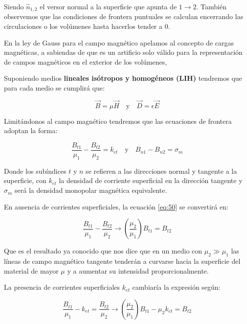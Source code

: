 Siendo $\hat{n}_{1,2}$ el versor normal a la superficie que apunta de $1 \rightarrow 2$. También  observemos que las condiciones de frontera puntuales se calculan encerrando las circulaciones o los volúmenes hasta hacerlos tender a 0.

En la ley de Gauss para el campo magnético apelamos al concepto de cargas magnéticas, a sabiendas de que es un artificio solo válido para la representación de campos magnéticos en el exterior de los volúmenes, 

Suponiendo medios \textbf{lineales isótropos y homogéneos (LIH)} tendremos que para cada medio se cumplirá que:

\begin{equation}
	\overrightarrow{B}=\mu \overrightarrow{H} \quad \text{y} \quad \overrightarrow{D}= \epsilon \overrightarrow{E}
\end{equation}

Limitándonos al campo magnético tendremos que las ecuaciones de frontera adoptan la forma:

\begin{equation}
	\label{eq:50}
	\dfrac{B_{t1}}{\mu_{1}} -\dfrac{B_{t2}}{\mu_{2}} =k_{et} \quad \text{y} \quad B_{n1}-B_{n2} =  \sigma_{m} 
\end{equation}

Donde los subíndices $t$ y $n$ se refieren a las direcciones normal y tangente a la superficie, con $k_{et}$ la densidad de corriente superficial en la dirección tangente y $\sigma_{m}$ será la densidad monopolar magnética equivalente.

En ausencia de corrientes superficiales, la ecuación \ref{eq:50} se convertirá en:

\begin{equation}
	\label{eq:51}
	\dfrac{B_{t1}}{\mu_{1}} -\dfrac{B_{t2}}{\mu_{2}} \rightarrow \left( \dfrac{\mu_{2}}{\mu_{1}}\right)  B_{t1}= B_{t2}
\end{equation}

Que es el resultado ya conocido que nos dice que en un medio con $\mu_{2}\gg\mu_{1}$ las líneas de campo magnético tangente tenderán a curvarse hacia la superficie del material de mayor $\mu$ y a aumentar su intensidad proporcionalmente.

La presencia de corrientes superficiales $k_{et}$ cambiaría la expresión según:

\begin{equation}
	\label{eq:52}
	\dfrac{B_{t1}}{\mu_{1}} - k_{et} = \dfrac{B_{t2}}{\mu_{2}} \rightarrow \left( \dfrac{\mu_{2}}{\mu_{1}}\right) B_{t1} - \mu_{2} k_{et} = B_{t2}
\end{equation}


